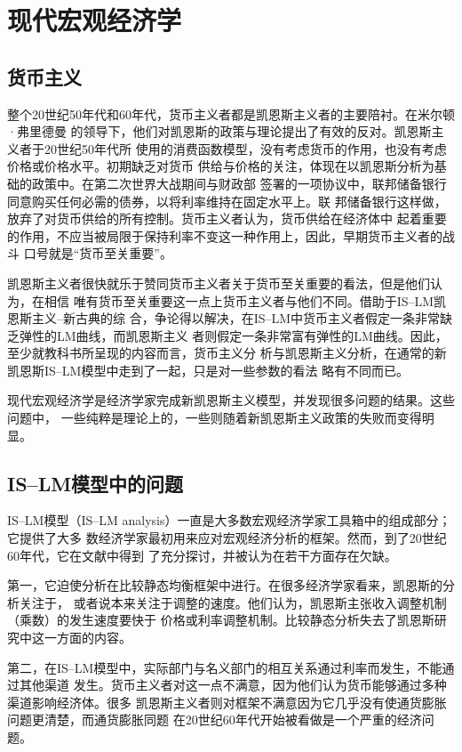 \section{现代宏观经济学}

\subsection{货币主义}

整个20世纪50年代和60年代，货币主义者都是凯恩斯主义者的主要陪衬。在米尔顿·弗里德曼
的领导下，他们对凯恩斯的政策与理论提出了有效的反对。凯恩斯主义者于20世纪50年代所
使用的消费函数模型，没有考虑货币的作用，也没有考虑价格或价格水平。初期缺乏对货币
供给与价格的关注，体现在以凯恩斯分析为基础的政策中。在第二次世界大战期间与财政部
签署的一项协议中，联邦储备银行同意购买任何必需的债券，以将利率维持在固定水平上。联
邦储备银行这样做，放弃了对货币供给的所有控制。货币主义者认为，货币供给在经济体中
起着重要的作用，不应当被局限于保持利率不变这一种作用上，因此，早期货币主义者的战斗
口号就是“货币至关重要”。

凯恩斯主义者很快就乐于赞同货币主义者关于货币至关重要的看法，但是他们认为，在相信
唯有货币至关重要这一点上货币主义者与他们不同。借助于IS--LM凯恩斯主义--新古典的综
合，争论得以解决，在IS--LM中货币主义者假定一条非常缺乏弹性的LM曲线，而凯恩斯主义
者则假定一条非常富有弹性的LM曲线。因此，至少就教科书所呈现的内容而言，货币主义分
析与凯恩斯主义分析，在通常的新凯恩斯IS--LM模型中走到了一起，只是对一些参数的看法
略有不同而已。

现代宏观经济学是经济学家完成新凯恩斯主义模型，并发现很多问题的结果。这些问题中，
一些纯粹是理论上的，一些则随着新凯恩斯主义政策的失败而变得明显。

\subsection{IS--LM模型中的问题}

IS--LM模型（IS--LM analysis）一直是大多数宏观经济学家工具箱中的组成部分；它提供了大多
数经济学家最初用来应对宏观经济分析的框架。然而，到了20世纪60年代，它在文献中得到
了充分探讨，并被认为在若干方面存在欠缺。

第一，它迫使分析在比较静态均衡框架中进行。在很多经济学家看来，凯恩斯的分析关注于，
或者说本来关注于调整的速度。他们认为，凯恩斯主张收入调整机制（乘数）的发生速度要快于
价格或利率调整机制。比较静态分析失去了凯恩斯研究中这一方面的内容。

第二，在IS--LM模型中，实际部门与名义部门的相互关系通过利率而发生，不能通过其他渠道
发生。货币主义者对这一点不满意，因为他们认为货币能够通过多种渠道影响经济体。很多
凯恩斯主义者则对框架不满意因为它几乎没有使通货膨胀问题更清楚，而通货膨胀同题
在20世纪60年代开始被看做是一个严重的经济问题。

